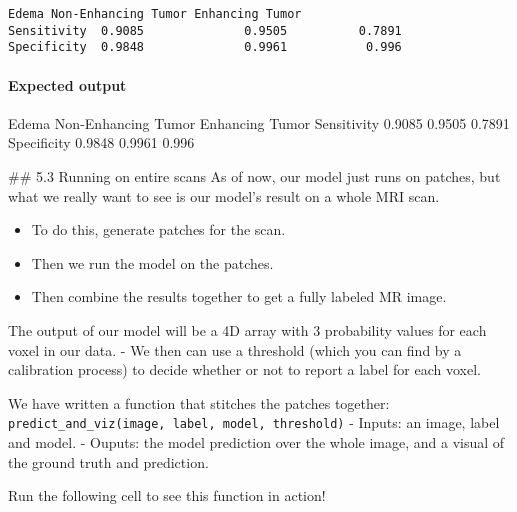 \documentclass[11pt]{article}
\providecommand{\tightlist}{%
      \setlength{\itemsep}{0pt}\setlength{\parskip}{0pt}}
\newenvironment{Shaded}{}{}
\newcommand{\FloatTok}[1]{\textcolor[rgb]{0.25,0.63,0.44}{{#1}}}
\newcommand{\NormalTok}[1]{{#1}}
\newcommand{\OperatorTok}[1]{\textcolor[rgb]{0.40,0.40,0.40}{{#1}}}
\begin{document}
    \begin{Verbatim}[commandchars=\\\{\}]
              Edema Non-Enhancing Tumor Enhancing Tumor
Sensitivity  0.9085              0.9505          0.7891
Specificity  0.9848              0.9961           0.996

    \end{Verbatim}

    \hypertarget{expected-output}{%
\paragraph{Expected output}\label{expected-output}}

\begin{Shaded}
\begin{Highlighting}[]
\NormalTok{              Edema Non}\OperatorTok{-}\NormalTok{Enhancing Tumor Enhancing Tumor}
\NormalTok{Sensitivity  }\FloatTok{0.9085}              \FloatTok{0.9505}          \FloatTok{0.7891}
\NormalTok{Specificity  }\FloatTok{0.9848}              \FloatTok{0.9961}           \FloatTok{0.996}
\end{Highlighting}
\end{Shaded}

     \#\# 5.3 Running on entire scans As of now, our model just runs on
patches, but what we really want to see is our model's result on a whole
MRI scan.

\begin{itemize}
\tightlist
\item
  To do this, generate patches for the scan.
\item
  Then we run the model on the patches.
\item
  Then combine the results together to get a fully labeled MR image.
\end{itemize}

The output of our model will be a 4D array with 3 probability values for
each voxel in our data. - We then can use a threshold (which you can
find by a calibration process) to decide whether or not to report a
label for each voxel.

We have written a function that stitches the patches together:
\texttt{predict\_and\_viz(image,\ label,\ model,\ threshold)} - Inputs:
an image, label and model. - Ouputs: the model prediction over the whole
image, and a visual of the ground truth and prediction.

Run the following cell to see this function in action!
\end{document}
